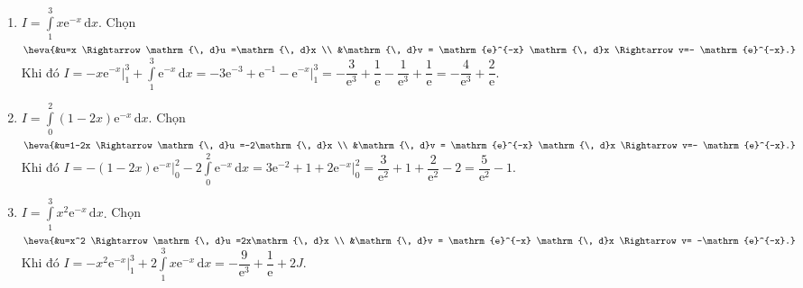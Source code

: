 \begin{bt}
\begin{enumerate}
    \loigiai
    {
    Chọn $\heva{&u=x-1 \Rightarrow \mathrm{\, d}u =\mathrm{\, d}x \\ &\mathrm{\, d}v = \mathrm{e}^{2x} \mathrm{\, d}x \Rightarrow v=\dfrac {1}{2} \mathrm{e}^{2x}.}$\\
    Khi đó $I=\dfrac {1}{2} (x-1)\mathrm{e}^{2x}\Big|_0^1 - \dfrac {1}{2} \displaystyle\int\limits_0^{1} \mathrm{e}^{2x} \mathrm{\, d}x
    = \dfrac {1}{2}-\dfrac {1}{4} \mathrm{e}^{2x} \Big|_0^1 = \dfrac{3}{4}-\dfrac {1}{4} \mathrm{e}^2$.
    }
    \item $I=\displaystyle\int\limits_1^{3} x\mathrm{e}^{-x} \mathrm{\, d}x$.
    \loigiai
    {
    Chọn $\heva{&u=x \Rightarrow \mathrm{\, d}u =\mathrm{\, d}x \\ &\mathrm{\, d}v = \mathrm{e}^{-x} \mathrm{\, d}x \Rightarrow v=- \mathrm{e}^{-x}.}$\\
    Khi đó $I=-x\mathrm{e}^{-x}\Big|_1^3 + \displaystyle\int\limits_1^{3} \mathrm{e}^{-x} \mathrm{\, d}x
    = -3 \mathrm{e}^{-3}+\mathrm{e}^{-1}-\mathrm{e}^{-x}\Big|_1^3 = -\dfrac{3}{\mathrm{e}^{3}}+\dfrac{1}{\mathrm{e}}-\dfrac{1}{\mathrm{e}^{3}}+\dfrac{1}{\mathrm{e}}=-\dfrac{4}{\mathrm{e}^{3}}+\dfrac {2}{\mathrm{e}}$.
    }
    \item $I=\displaystyle\int\limits_0^{2} (1-2x)\mathrm{e}^{-x} \mathrm{\, d}x$.
    \loigiai
    {
    Chọn $\heva{&u=1-2x \Rightarrow \mathrm{\, d}u =-2\mathrm{\, d}x \\ &\mathrm{\, d}v = \mathrm{e}^{-x} \mathrm{\, d}x \Rightarrow v=- \mathrm{e}^{-x}.}$\\
    Khi đó $I=-(1-2x)\mathrm{e}^{-x} \Big|_0^2 -2\displaystyle\int\limits_0^{2} \mathrm{e}^{-x} \mathrm{\, d}x = 3 \mathrm{e}^{-2}+1+2\mathrm{e}^{-x} \Big|_0^2 = \dfrac{3}{\mathrm{e}^{2}}+1+\dfrac{2}{\mathrm{e}^{2}}-2=\dfrac{5}{\mathrm{e}^{2}}-1$.
    }
    \item $I=\displaystyle\int\limits_1^{3} x^2 \mathrm{e}^{-x} \mathrm{\, d}x$.
    \loigiai
    {
    Chọn $\heva{&u=x^2 \Rightarrow \mathrm{\, d}u =2x\mathrm{\, d}x \\ &\mathrm{\, d}v = \mathrm{e}^{-x} \mathrm{\, d}x \Rightarrow v= -\mathrm{e}^{-x}.}$\\
    Khi đó $I=-x^2\mathrm{e}^{-x} \Big|_1^3 +2\displaystyle\int\limits_1^{3} x\mathrm{e}^{-x} \mathrm{\, d}x = -\dfrac{9}{\mathrm{e}^3}+\dfrac{1}{\mathrm{e}}+2J$.\\
}
\end{enumerate}
\end{bt}
